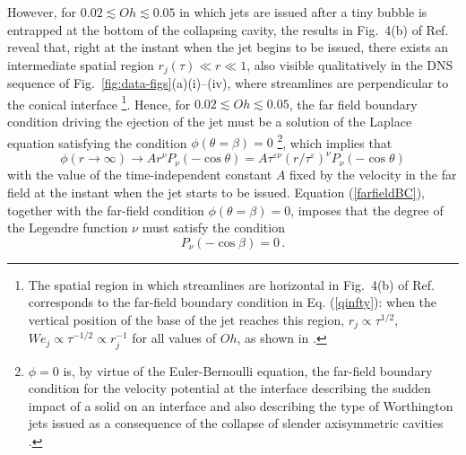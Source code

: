 \documentclass[twocolumn]{revtex4-2}
\begin{document}
However, for $0.02\lesssim Oh\lesssim 0.05$ in which jets are issued after a tiny bubble is entrapped at the bottom of the collapsing cavity, the results in Fig.~4(b) of Ref.~\cite{PRF2023} reveal that, right at the instant when the jet begins to be issued, there exists an intermediate spatial region $r_j(\tau)\ll r\ll 1$, also visible qualitatively in the DNS sequence of Fig.~\ref{fig:data-figs}(a)(i)--(iv),
where streamlines are perpendicular to the conical interface \footnote{The spatial region in which streamlines are horizontal in Fig.~4(b) of Ref.~\cite{PRF2023} corresponds to the far-field boundary condition in Eq. (\ref{qinfty}): when the vertical position of the base of the jet reaches this region, $r_j\propto \tau^{1/2}$, $We_j\propto \tau^{-1/2}\propto r^{-1}_j$ for all values of $Oh$, as shown in \cite{PRF2023}.}. Hence, for $0.02\lesssim Oh\lesssim 0.05$, the far field boundary condition driving the ejection of the jet must be a solution of the Laplace equation satisfying the condition $\phi(\theta=\beta)=0$
\footnote{$\phi=0$ is, by virtue of the Euler-Bernoulli equation, the far-field boundary condition for the velocity potential at the interface describing the sudden impact of a solid on an interface \cite{wagner1932} and also describing the type of Worthington jets issued as a consequence of the collapse of slender axisymmetric cavities \cite{PRF2023}.}, which implies that
\begin{equation}
\phi(r\rightarrow\infty)\rightarrow A r^\nu P_\nu(-\cos\theta)=A \tau^{\varepsilon \nu}\left(r/\tau^\varepsilon\right)^\nu P_\nu(-\cos\theta) \label{farfieldBC}
\end{equation}
with the value of the time-independent constant $A$ fixed by the velocity in the far field at the instant when the jet starts to be issued. Equation (\ref{farfieldBC}), together with the far-field condition $\phi(\theta = \beta) = 0$, imposes that the degree of the Legendre function $\nu$ must satisfy the condition
\begin{equation}
P_\nu(-\cos\beta)=0\, .\label{condition}
\end{equation}
\end{document}

